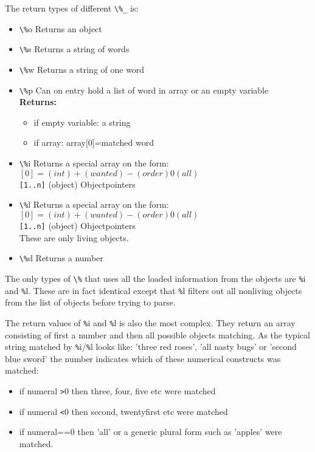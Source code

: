     The return types of different \verb+\%_+ is:
    \begin{itemize}
    \item{\verb+\%+o}   Returns an object
    \item{\verb+\%+s}   Returns a string of words
    \item{\verb+\%+w} Returns a string of one word
    \item{\verb+\%+p}   Can on entry hold a list of word in array
                or an empty variable \\
            {\bf Returns:}
            \begin{itemize}
            \item if empty variable: a string
            \item if array: array[0]=matched word
            \end{itemize}
    \item{\verb+\%+i}   Returns a special array on the form: \\
            $[0] = (int) +(wanted) -(order) 0(all)$ \\
            \verb+[1..n]+ (object) Objectpointers
    \item{\verb+\%+l}   Returns a special array on the form: \\
            $[0] = (int) +(wanted) -(order) 0(all)$ \\
            \verb+[1..n]+ (object) Objectpointers \\
            These are only living objects.
    \item{\verb+\%+d} Returns a number
    \end{itemize}

  The only types of \verb+\%+ that uses all the loaded information from the objects
  are \verb+%+i and \verb+%+l. These are in fact identical except that \verb+%+l filters out
  all nonliving objects from the list of objects before trying to parse.

  The return values of \verb+%+i and \verb+%+l is also the most complex. They return an
  array consisting of first a number and then all possible objects matching.
  As the typical string matched by \verb+%+i/\verb+%+l looks like: 'three red roses',
  'all nasty bugs' or 'second blue sword' the number indicates which 
  of these numerical constructs was matched:
  
        \begin{itemize}
        \item if numeral \verb+>+0 then three, four, five etc were matched
        \item if numeral \verb+<+0 then second, twentyfirst etc were matched
        \item if numeral==0 then 'all' or a generic plural form such as 'apples'
                            were matched.
        \end{itemize}

